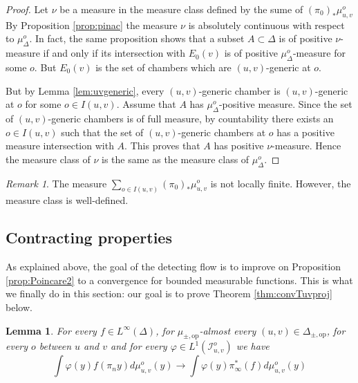 \documentclass[a4paper, 11pt]{article}
\theoremstyle{plain}
\newtheorem{lemma}[proposition]{Lemma}
\theoremstyle{definition}
\theoremstyle{remark}
\newtheorem{remark}[proposition]{Remark}
\newcommand{\pmop}{ {\pm,\mathrm{op}}}
\newcommand{\IR}{\mathcal I}
\begin{document}
\begin{proof}
Let $\nu$ be a measure in the measure class defined by the sume of $(\pi_0)_*\mu_{u,v}^o$ 
 By Proposition \ref{prop:pinac} the measure $\nu$ is absolutely continuous with respect to $\mu^o_\Delta$. In fact, the same proposition shows that a subset $A\subset \Delta$ is of positive $\nu$-measure if and only if its intersection with $E_0(v)$ is of positive $\mu_\Delta^o$-measure for some $o$. But $E_0(v)$ is the set of chambers which are $(u,v)$-generic at $o$.
 
  But by Lemma \ref{lem:uvgeneric}, every $(u,v)$-generic chamber is $(u,v)$-generic at $o$ for some $o\in I(u,v)$. Assume that $A$ has $\mu^o_\Delta$-positive measure. Since the set of $(u,v)$-generic chambers is of full measure, by countability there exists an $o\in I(u,v)$ such that the set of $(u,v)$-generic chambers at $o$ has a positive measure intersection with $A$. This proves that $A$ has positive $\nu$-measure. Hence the measure class of $\nu$ is the same as the measure class of $\mu_\Delta^o$.
  
\end{proof}

\begin{remark}
The measure $ \sum_{o\in I(u,v)}(\pi_0)_*\mu_{u,v}^o$ is not locally finite. However, the measure class is well-defined.
\end{remark}





\subsection{Contracting properties} \label{subsec:CP}

As explained above, the goal of the detecting flow is to improve on Proposition \ref{prop:Poincare2} to a convergence for bounded measurable functions. This is what we finally do in this section: our goal is to prove Theorem \ref{thm:convTuvproj} below.




\begin{lemma}\label{cor:weak*conv-uv}
For every $f\in L^\infty(\Delta)$, for $\mu_\pmop$-almost every $(u,v)\in \Delta_\pmop$, for every $o$ between $u$ and $v$ and for every $\varphi\in L^1(\IR_{u,v}^o)$ we have
$$\int \varphi(y) f(\pi_n y) d\mu_{u,v}^o(y)\longrightarrow \int \varphi(y) \pi_\infty^* (f) d\mu_{u,v}^o(y)$$ 
\end{lemma}
\end{document}
